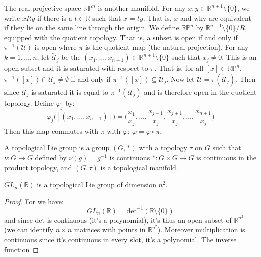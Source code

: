         \begin{example}
            The real projective space $\mathbb{RP}^{n}$ is another
            manifold. For any $x,y\in\mathbb{R}^{n+1}\setminus\{0\}$,
            we write $xRy$ if there is a $t\in\mathbb{R}$ such that
            $x=ty$. That is, $x$ and why are equivalent if they lie on
            the same line through the origin. We define
            $\mathbb{RP}^{n}$ by $\mathbb{R}^{n+1}\setminus\{0\}/R$,
            equipped with the quotient topology. That is, a subset is
            open if and only if $\pi^{\minus{1}}(\mathcal{U})$ is open
            where $\pi$ is the quotient map (the natural projection).
            For any $k=1,\dots,n$, let $\tilde{\mathcal{U}}_{j}$ be the
            $(x_{1},\dots,x_{n+1})\in\mathbb{R}^{n+1}\setminus\{0\}$
            such that $x_{j}\ne{0}$. This is an open subset and it is
            saturated with respect to $\pi$. That is, for all
            $[x]\in\mathbb{RP}^{n}$,
            $\pi^{\minus{1}}([x])\cap\tilde{\mathcal{U}}_{j}\ne\emptyset$
            if and only if $\pi^{\minus{1}}([x])\subseteq\tilde{\mathcal{U}}_{j}$.
            Now let $\mathcal{U}=\pi(\tilde{\mathcal{U}}_{j})$. Then
            since $\tilde{\mathcal{U}}_{j}$ is saturated it is equal
            to $\pi^{\minus{1}}(\mathcal{U}_{j})$ and is therefore
            open in the quotient topology. Define $\varphi_{j}$ by:
            \begin{equation}
                \varphi_{j}\big([(x_{1},\dots,x_{n+1})]\big)
                =\big(\frac{x_{1}}{x_{j}},\dots,
                    \frac{x_{j-1}}{x_{j}},\frac{x_{j+1}}{x_{j}},\dots,
                    \frac{x_{n+1}}{x_{j}}\big)
            \end{equation}
            Then this map commutes with $\pi$ with $\tilde{\varphi}$:
            $\tilde{\varphi}=\varphi\circ\pi$.
        \end{example}
    \begin{definition}
        A topological Lie group is a group $(G,*)$ with a topology $\tau$ on
        $G$ such that $\nu:G\rightarrow{G}$ defined by
        $\nu(g)=g^{\minus{1}}$ is continuous $*:G\times{G}\rightarrow{G}$ is
        continuous in the product topology, and $(G,\tau)$ is a topological
        manifold.
    \end{definition}
    \begin{theorem}
        $GL_{n}(\mathbb{R})$ is a topological Lie group of dimension
        $n^{2}$.
    \end{theorem}
    \begin{proof}
        For we have:
        \begin{equation}
            GL_{n}(\mathbb{R})=
            \textrm{det}^{\minus{1}}(\mathbb{R}\setminus\{0\})
        \end{equation}
        and since $\textrm{det}$ is continuous (it's a polynomial), it's
        thus an open subset of $\mathbb{R}^{n^{2}}$ (we can identify
        $n\times{n}$ matrices with points in $\mathbb{R}^{n^{2}}$). Moreover
        multiplication is continuous since it's continuous in every slot,
        it's a polynomial. The inverse function
    \end{proof}
